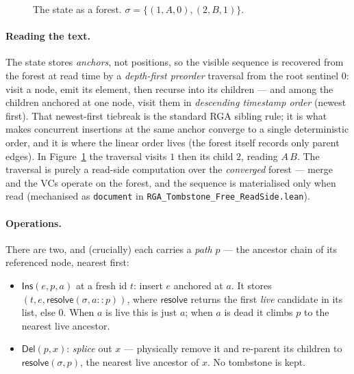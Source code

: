 \documentclass[11pt]{article}
\newcommand{\anc}{\mathsf{anc}}
\newcommand{\el}{\mathsf{el}}
\newcommand{\resolve}{\mathsf{resolve}}
\newcommand{\Ins}{\mathsf{Ins}}
\newcommand{\Del}{\mathsf{Del}}
\begin{document}
\begin{figure}[h]
\centering
{}
\caption{The state as a forest. $\sigma=\{(1,A,0),(2,B,1)\}$.}
\label{fig:state}
\end{figure}

\paragraph{Reading the text.} The state stores \emph{anchors}, not positions,
so the visible sequence is recovered from the forest at read time by a
\emph{depth-first preorder} traversal from the root sentinel $0$: visit a node,
emit its element, then recurse into its children --- and among the children
anchored at one node, visit them in \emph{descending timestamp order} (newest
first). That newest-first tiebreak is the standard RGA sibling rule; it is what
makes concurrent insertions at the same anchor converge to a single
deterministic order, and it is where the linear order lives (the forest itself
records only parent edges). In Figure~\ref{fig:state} the traversal visits $1$
then its child $2$, reading $A\,B$. The traversal is purely a read-side
computation over the \emph{converged} forest --- merge and the VCs operate on
the forest, and the sequence is materialised only when read (mechanised as
\texttt{document} in \texttt{RGA\_Tombstone\_Free\_ReadSide.lean}).

\paragraph{Operations.} There are two, and (crucially) each carries a \emph{path}
$p$ --- the ancestor chain of its referenced node, nearest first:
\begin{itemize}
  \item $\Ins(e, p, a)$ at a fresh id $t$: insert $e$ anchored at $a$. It stores
        $(t, e, \resolve(\sigma, a\!::\!p))$, where $\resolve$ returns the first
        \emph{live} candidate in its list, else $0$. When $a$ is live this is just
        $a$; when $a$ is dead it climbs $p$ to the nearest live ancestor.
  \item $\Del(p, x)$: \emph{splice} out $x$ --- physically remove it and re-parent
        its children to $\resolve(\sigma, p)$, the nearest live ancestor of $x$.
        No tombstone is kept.
\end{itemize}
\end{document}
